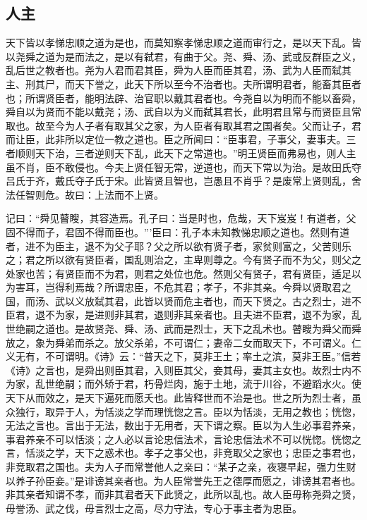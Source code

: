 \documentclass[]{article}
\begin{document}
\hypertarget{header-n1595}{%
\subsection{人主}\label{header-n1595}}

天下皆以孝悌忠顺之道为是也，而莫知察孝悌忠顺之道而审行之，是以天下乱。皆以尧舜之道为是而法之，是以有弑君，有曲于父。尧、舜、汤、武或反群臣之义，乱后世之教者也。尧为人君而君其臣，舜为人臣而臣其君，汤、武为人臣而弑其主、刑其尸，而天下誉之，此天下所以至今不治者也。夫所谓明君者，能畜其臣者也；所谓贤臣者，能明法辟、治官职以戴其君者也。今尧自以为明而不能以畜舜，舜自以为贤而不能以戴尧；汤、武自以为义而弑其君长，此明君且常与而贤臣且常取也。故至今为人子者有取其父之家，为人臣者有取其君之国者矣。父而让子，君而让臣，此非所以定位一教之道也。臣之所闻曰：``臣事君，子事父，妻事夫。三者顺则天下治，三者逆则天下乱，此天下之常道也。''明王贤臣而弗易也，则人主虽不肖，臣不敢侵也。今夫上贤任智无常，逆道也，而天下常以为治。是故田氏夺吕氏于齐，戴氏夺子氏于宋。此皆贤且智也，岂愚且不肖乎？是废常上贤则乱，舍法任智则危。故曰：上法而不上贤。

记曰：``舜见瞽瞍，其容造焉。孔子曰：当是时也，危哉，天下岌岌！有道者，父固不得而子，君固不得而臣也。'''臣曰：孔子本未知教悌忠顺之道也。然则有道者，进不为臣主，退不为父子耶？父之所以欲有贤子者，家贫则富之，父苦则乐之；君之所以欲有贤臣者，国乱则治之，主卑则尊之。今有贤子而不为父，则父之处家也苦；有贤臣而不为君，则君之处位也危。然则父有贤子，君有贤臣，适足以为害耳，岂得利焉哉？所谓忠臣，不危其君；孝子，不非其亲。今舜以贤取君之国，而汤、武以义放弑其君，此皆以贤而危主者也，而天下贤之。古之烈士，进不臣君，退不为家，是进则非其君，退则非其亲者也。且夫进不臣君，退不为家，乱世绝嗣之道也。是故贤尧、舜、汤、武而是烈士，天下之乱术也。瞽瞍为舜父而舜放之，象为舜弟而杀之。放父杀弟，不可谓仁；妻帝二女而取天下，不可谓义。仁义无有，不可谓明。《诗》云：``普天之下，莫非王土；率土之滨，莫非王臣。''信若《诗》之言也，是舜出则臣其君，入则臣其父，妾其母，妻其主女也。故烈士内不为家，乱世绝嗣；而外矫于君，朽骨烂肉，施于土地，流于川谷，不避蹈水火。使天下从而效之，是天下遍死而愿夭也。此皆释世而不治是也。世之所为烈士者，虽众独行，取异于人，为恬淡之学而理恍惚之言。臣以为恬淡，无用之教也；恍惚，无法之言也。言出于无法，数出于无用者，天下谓之察。臣以为人生必事君养亲，事君养亲不可以恬淡；之人必以言论忠信法术，言论忠信法术不可以恍惚。恍惚之言，恬淡之学，天下之惑术也。孝子之事父也，非竞取父之家也；忠臣之事君也，非竞取君之国也。夫为人子而常誉他人之亲曰：``某子之亲，夜寝早起，强力生财以养子孙臣妾。''是诽谤其亲者也。为人臣常誉先王之德厚而愿之，诽谤其君者也。非其亲者知谓不孝，而非其君者天下此贤之，此所以乱也。故人臣毋称尧舜之贤，毋誉汤、武之伐，毋言烈士之高，尽力守法，专心于事主者为忠臣。
\end{document}
